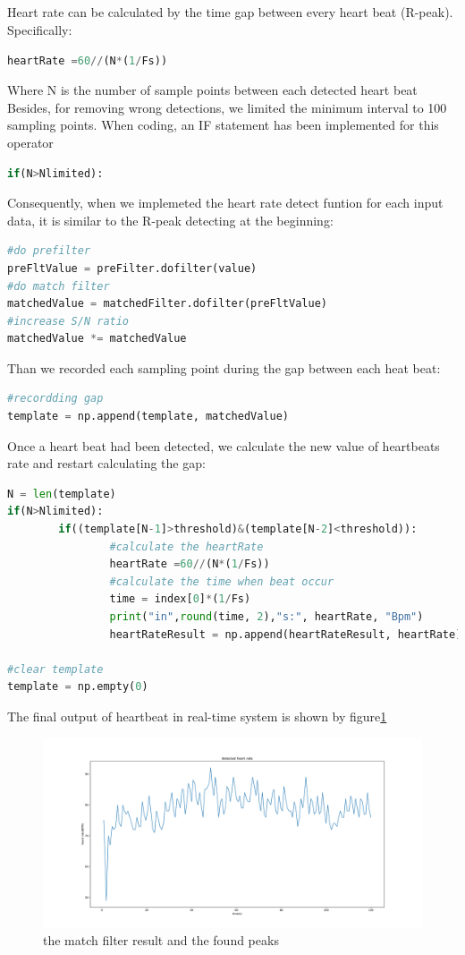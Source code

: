 \documentclass[a4paper,12pt]{article}
\begin{document}
\subsection{}
Heart rate can be calculated by the time gap between every heart beat (R-peak). Specifically:
\begin{lstlisting}[language=Python]
heartRate =60//(N*(1/Fs))
\end{lstlisting}
Where N is the number of sample points between each detected heart beat\\
Besides, for removing wrong detections, we limited the minimum interval to 100 sampling points. When coding,  an IF statement has been implemented for this operator
\begin{lstlisting}[language=Python]
if(N>Nlimited):
\end{lstlisting}
Consequently, when we implemeted the heart rate detect funtion for each input data, it is similar to the R-peak detecting at the beginning:
\begin{lstlisting}[language=Python]
#do prefilter
preFltValue = preFilter.dofilter(value)
#do match filter
matchedValue = matchedFilter.dofilter(preFltValue)
#increase S/N ratio
matchedValue *= matchedValue
\end{lstlisting}
Than we recorded  each sampling point during the gap between each heat beat:
\begin{lstlisting}[language=Python]
#recordding gap
template = np.append(template, matchedValue)
\end{lstlisting}
Once a heart beat had been detected, we calculate the new value of heartbeats rate and restart calculating the gap:
\begin{lstlisting}[language=Python]
N = len(template)
if(N>Nlimited):
		if((template[N-1]>threshold)&(template[N-2]<threshold)):
				#calculate the heartRate
				heartRate =60//(N*(1/Fs))
				#calculate the time when beat occur
				time = index[0]*(1/Fs)
				print("in",round(time, 2),"s:", heartRate, "Bpm")
				heartRateResult = np.append(heartRateResult, heartRate)
				
#clear template
template = np.empty(0)
\end{lstlisting}
The final output of heartbeat in real-time system is shown by figure\ref{fig_heartRate}
\begin{figure}[H]   
	\centering 
	\includegraphics[width=12cm]{../Figures/heartRate.pdf} 
	\caption{the match filter result and the found peaks} 
	\label{fig_heartRate}
\end{figure}
\end{document}
